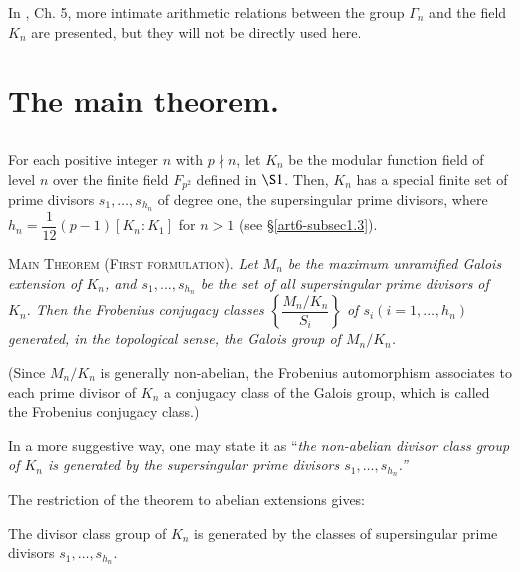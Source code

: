 In \cite{art6-key8}, Ch. 5, more intimate arithmetic relations between the group $\Gamma_n$ and the field $K_n$ are presented, but they will not be directly used here.


\section{The main theorem.}\label{art6-sec2}

\subsection{}\label{art6-subsec2.1}
For each positive integer $n$ with $p \nmid n$, let $K_n$ be the modular function field of level $n$ over the finite field $F_{p^2}$ defined in $\S 1$. Then, $K_n$ has a special finite set of prime divisors $s_1, \ldots, s_{h_n}$ of degree one, the supersingular prime divisors, where $h_n = \dfrac{1}{12} (p-1) [K_n : K_1]$ for $n >1$ (see \S \ref{art6-subsec1.3}).


\noindent
\textsc{Main Theorem (First formulation).} 
\textit{Let $M_n$ be the maximum unramified Galois extension of $K_n$, and $s_1, \ldots, s_{h_n}$ be the set of all supersingular prime divisors of $K_n$. Then the Frobenius conjugacy classes $\left\{\dfrac{M_n/K_n}{S_i} \right\}$ of $s_i (i=1, \ldots, h_n)$ generated, in the topological sense, the Galois group of $M_n / K_n$.}

(Since $M_n/K_n$ is generally non-abelian, the Frobenius automorphism associates to each prime divisor of $K_n$ a conjugacy class of the Galois group, which is called the Frobenius conjugacy class.)

In a more suggestive way, one may state it as ``\textit{the non-abelian divisor class group of $K_n$ is generated by the supersingular prime divisors $s_1,\ldots, s_{h_n}$.''}

The restriction of the theorem to abelian extensions gives:

\begin{corollary}\label{art6-coro1}
The divisor class group of $K_n$ is generated by the classes of supersingular prime divisors $s_1, \ldots, s_{h_n}$.
\end{corollary}

